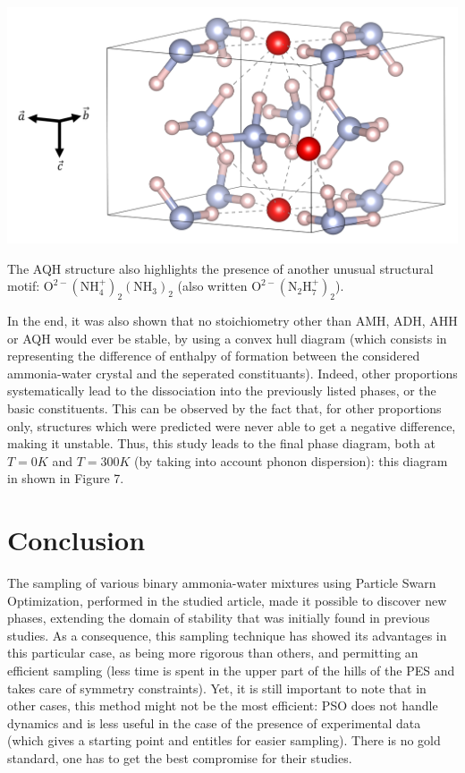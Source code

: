 \documentclass[11pt]{article}
\begin{document}
\begin{multicols}{2}
\bigskip
\noindent\begin{center}
    \includegraphics[width=0.9\columnwidth]{figures/AQH.png}
\end{center}
\medskip 

The AQH structure also highlights the presence of another unusual structural motif: $\mathrm{O}^{2-}(\mathrm{N}\mathrm{H}_4^+)_2(\mathrm{N}\mathrm{H}_3)_2$ (also written $\mathrm{O}^{2-}(\mathrm{N}_2\mathrm{H}_7^+)_2$).\vspace{1em}

\noindent In the end, it was also shown that no stoichiometry other than AMH, ADH, AHH or AQH would ever be stable, by using a convex hull diagram (which consists in representing the difference of enthalpy of formation between the considered ammonia-water crystal and the seperated constituants). Indeed, other proportions systematically lead to the dissociation into the previously listed phases, or the basic constituents. This can be observed by the fact that, for other proportions only, structures which were predicted were never able to get a negative difference, making it unstable. Thus, this study leads to the final phase diagram, both at $T=0K$ and $T=300K$ (by taking into account phonon dispersion): this diagram in shown in Figure 7.

\section*{Conclusion}
The sampling of various binary ammonia-water mixtures using Particle Swarn Optimization, performed in the studied article, made it possible to discover new phases, extending the domain of stability that was initially found in previous studies. As a consequence, this sampling technique has showed its advantages in this particular case, as being more rigorous than others, and permitting an efficient sampling (less time is spent in the upper part of the hills of the PES and takes care of symmetry constraints). Yet, it is still important to note that in other cases, this method might not be the most efficient: PSO does not handle dynamics and is less useful in the case of the presence of experimental data (which gives a starting point and entitles for easier sampling). There is no gold standard, one has to get the best compromise for their studies.

\end{multicols}
\end{document}
